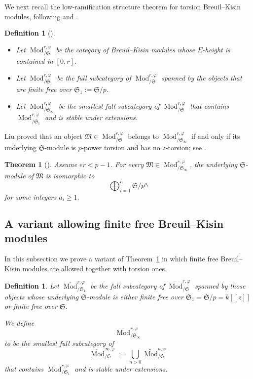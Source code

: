 \documentclass[11pt]{amsart}
\newtheorem{thm}[lemma]{Theorem}
\newtheorem{definition}[lemma]{Definition}
\numberwithin{equation}{section}
\newcommand{\BKMod}{\operatorname{Mod}_{/\mS}}
\newcommand{\BKModone}{\operatorname{Mod}_{/\mS_1}}
\newcommand{\BKModinf}{\operatorname{Mod}_{/\mS_{\infty}}}
\newcommand{\mf}{\mathfrak}
\newcommand{\fM}{\mf{M}}
\newcommand{\Mod}{\operatorname{Mod}}
\newcommand{\mS}{\mf{S}}
\numberwithin{equation}{section}
\begin{document}
We next recall the low-ramification structure theorem for torsion
Breuil--Kisin modules, following \cite{CL09} and \cite[Section~6]{M21}.

\begin{definition}[{\cite[Section~2.1]{CL09}}]
\begin{itemize}
  \item[(1)] Let $\BKMod^{r,\varphi}$ be the category of Breuil--Kisin
  modules whose $E$-height is contained in $[0,r]$.

  \item[(2)] Let $\BKModone^{r,\varphi}$ be the full subcategory of
  $\BKMod^{r,\varphi}$ spanned by the objects that are finite free over
  $\mS_1:=\mS/p$.

  \item[(3)] Let $\BKModinf^{r,\varphi}$ be the smallest full subcategory of
  $\BKMod^{r,\varphi}$ that contains $\BKModone^{r,\varphi}$ and is stable
  under extensions.
\end{itemize}
\end{definition}

Liu proved that an
object $\fM\in\BKMod^{r,\varphi}$ belongs to $\BKModinf^{r,\varphi}$ if and
only if its underlying $\mS$-module is $p$-power torsion and has no
$z$-torsion; see \cite[Section~2.3]{L07}.

\begin{thm}[{\cite[Theorem~6.20]{M21}}]\label{bkstruct}
Assume $er<p-1$.  For every $\fM\in\BKModinf^{r,\varphi}$, the underlying
$\mS$-module of $\fM$ is isomorphic to
\[
  \bigoplus_{i=1}^n \mS/p^{a_i}
\]
for some integers $a_i\geq 1$.
\end{thm}

\subsection{A variant allowing finite free Breuil--Kisin modules}

In this subsection we prove a variant of Theorem~\ref{bkstruct} in which
finite free Breuil--Kisin modules are allowed together with torsion ones.

\begin{definition}
Let $\overline{\Mod}^{r,\varphi}_{/\mS_1}$ be the full subcategory of
$\widetilde{\Mod}^{r,\varphi}_{/\mS}$ spanned by those objects whose underlying
$\mS$-module is either finite free over $\mS_1=\mS/p=k[[z]]$ or finite free
over $\mS$.

We define
\[
  \overline{\Mod}^{r,\varphi}_{/\mS_\infty}
\]
to be the smallest full subcategory of
\[
  \widetilde{\Mod}^{\infty,\varphi}_{/\mS}
  :=
  \bigcup_{n>0}\widetilde{\Mod}^{n,\varphi}_{/\mS}
\]
that contains $\overline{\Mod}^{r,\varphi}_{/\mS_1}$ and is stable under
extensions.
\end{definition}
\end{document}
